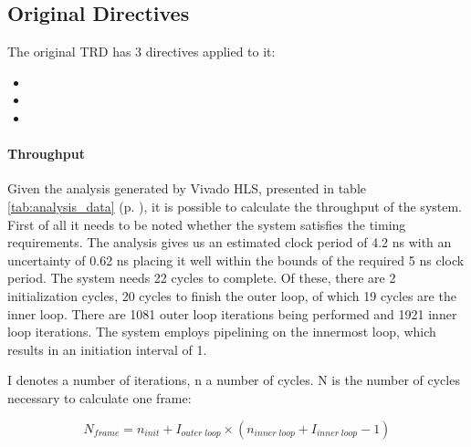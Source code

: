 \subsection{Original Directives}
\label{sec:original_pragma}

The original TRD has 3 directives applied to it:

\begin{itemize}
\item {}
\item {}
\item {}
\end{itemize}

\paragraph{Throughput}
\label{sec:original_througput}
Given the analysis generated by Vivado HLS, presented in table \ref{tab:analysis_data} (p. \pageref{tab:analysis_data}), it is possible to calculate the throughput of the system. First of all it needs to be noted whether the system satisfies the timing requirements. The analysis gives us an estimated clock period of 4.2 ns with an uncertainty of 0.62 ns placing it well within the bounds of the required 5 ns clock period.
The system needs 22 cycles to complete. Of these, there are 2 initialization cycles, 20 cycles to finish the outer loop, of which 19 cycles are the inner loop. There are 1081 outer loop iterations being performed and 1921 inner loop iterations. The system employs pipelining on the innermost loop, which results in an initiation interval of 1.

I denotes a number of iterations, n a number of cycles. N is the number of cycles necessary to calculate one frame:

\begin{equation}\label{eq:nframes_orig_trd}
N_{frame} = n_{init} + I_{outer\;loop} \times ( n_{inner\;loop} + I_{inner\;loop} - 1 )
\end{equation}



